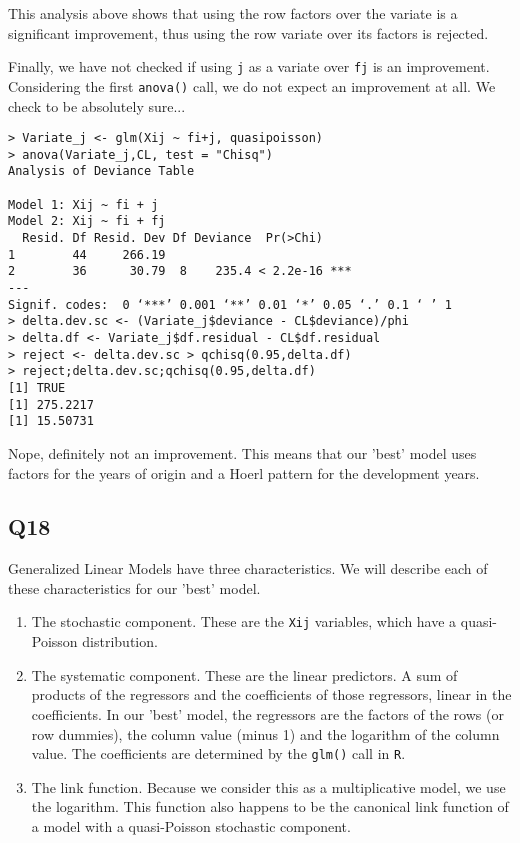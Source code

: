 \documentclass[11pt]{article}
\begin{document}
This analysis above shows that using the row factors over the variate is a significant improvement, thus using the row variate over its factors is rejected.

Finally, we have not checked if using \verb|j| as a variate over \verb|fj| is an improvement. Considering the first \verb|anova()| call, we do not expect an improvement at all. We check to be absolutely sure...

\begin{verbatim}
> Variate_j <- glm(Xij ~ fi+j, quasipoisson)
> anova(Variate_j,CL, test = "Chisq")
Analysis of Deviance Table

Model 1: Xij ~ fi + j
Model 2: Xij ~ fi + fj
  Resid. Df Resid. Dev Df Deviance  Pr(>Chi)    
1        44     266.19                          
2        36      30.79  8    235.4 < 2.2e-16 ***
---
Signif. codes:  0 ‘***’ 0.001 ‘**’ 0.01 ‘*’ 0.05 ‘.’ 0.1 ‘ ’ 1
> delta.dev.sc <- (Variate_j$deviance - CL$deviance)/phi
> delta.df <- Variate_j$df.residual - CL$df.residual
> reject <- delta.dev.sc > qchisq(0.95,delta.df)
> reject;delta.dev.sc;qchisq(0.95,delta.df)
[1] TRUE
[1] 275.2217
[1] 15.50731
\end{verbatim}

Nope, definitely not an improvement. This means that our 'best' model uses factors for the years of origin and a Hoerl pattern for the development years.

\subsection*{Q18}

Generalized Linear Models have three characteristics. We will describe each of these characteristics for our 'best'
model.
\begin{enumerate}
	\item The stochastic component. These are the \verb|Xij| variables, which have a quasi-Poisson distribution.
	\item The systematic component. These are the linear predictors. A sum of products of the regressors and the coefficients of those regressors, linear in the coefficients. In our 'best' model, the regressors are the factors of the rows (or row dummies), the column value (minus 1) and the logarithm of the column value. The coefficients are determined by the \verb|glm()| call in \verb|R|.
	\item The link function. Because we consider this as a multiplicative model, we use the logarithm. This function also happens to be the canonical link function of a model with a quasi-Poisson stochastic component.
\end{enumerate}
\end{document}
